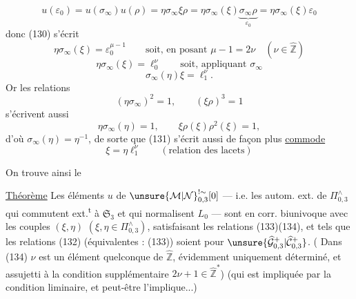 
 \deleted{$\unsure{\eta\sigma_\infty}$}
\[
u(\varepsilon_0)=u(\sigma_\infty)u(\rho)
=\eta\sigma_\infty\xi\rho
=\eta\sigma_\infty(\xi)\underbrace{\sigma_\infty\rho}_{\varepsilon_0}
=\eta\sigma_\infty(\xi)\varepsilon_0
\]
donc (130) s'écrit
\[
\eta\sigma_\infty(\xi)=\varepsilon_0^{\mu-1}
\qquad\text{soit, en posant }\mu-1=2\nu
\quad(\nu\in\widehat{\mathbb Z})
\]
\[
\eta\sigma_\infty(\xi)=\ell_0^\nu
\qquad\text{soit, appliquant }\sigma_\infty
\]
\[
\tag{131}
\sigma_\infty(\eta)\xi=\ell_1^\nu.
\]
Or les relations
\[
\tag{132}
(\eta\sigma_\infty)^2=1,\qquad(\xi\rho)^3=1
\]
s'écrivent aussi
\[
\tag{133}
\boxed{\eta\sigma_\infty(\eta)=1,\qquad
\xi\rho(\xi)\rho^2(\xi)=1},
\]
d'où $\sigma_\infty(\eta)=\eta^{-1}$, de sorte que (131) s'écrit
aussi de façon plus \uline{commode}
\[
\tag{134}
\boxed{\xi=\eta\ell_1^\nu}
\qquad(\text{relation des lacets})
\]


On trouve ainsi le

\uline{Théorème} Les éléments $u$ de
$\unsure{\mathcal M|\mathcal N}_{0,3}^{!\sim}[0]$ --- i.e. les
autom. ext. de $\Pi_{0,3}^{\wedge}$ qui commutent ext.\textsuperscript{t}
à $\mathfrak S_3$ et qui normalisent $L_0$ --- sont en corr.
biunivoque 
avec les couples $(\xi,\eta)$ $(\xi,\eta\in\Pi_{0,3}^{\wedge})$,
satisfaisant les relations (133)(134), et tels que
les relations (132) (équivalentes : (133)) soient
pour $\unsure{\widehat{\mathcal G}_{0,3}^{+}|\widehat{\mathcal C}_{0,3}^{+}}$.
( Dans (134) $\nu$ est un élément quelconque de
$\widehat{\mathbb Z}$, évidemment uniquement déterminé, et assujetti
à la condition supplémentaire $2\nu+1\in\widehat{\mathbb Z}^{*}$)
(qui est impliquée par la condition liminaire, et peut-être l'implique...)

